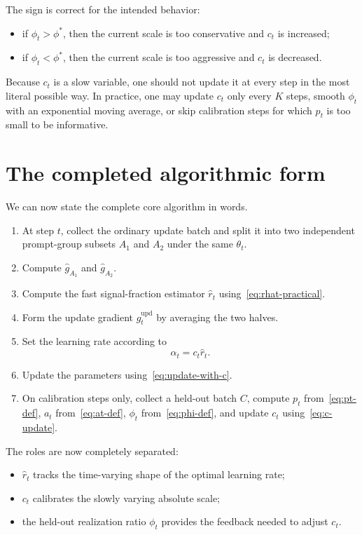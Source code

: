 \documentclass[11pt]{article}
\begin{document}
The sign is correct for the intended behavior:
\begin{itemize}
    \item if $\phi_t > \phi^*$, then the current scale is too conservative and $c_t$ is increased;
    \item if $\phi_t < \phi^*$, then the current scale is too aggressive and $c_t$ is decreased.
\end{itemize}
Because $c_t$ is a slow variable, one should not update it at every step in the most literal possible way. In practice, one may update $c_t$ only every $K$ steps, smooth $\phi_t$ with an exponential moving average, or skip calibration steps for which $p_t$ is too small to be informative.

\section{The completed algorithmic form}

We can now state the complete core algorithm in words.
\begin{enumerate}
    \item At step $t$, collect the ordinary update batch and split it into two independent prompt-group subsets $A_1$ and $A_2$ under the same $\theta_t$.
    \item Compute $\hat g_{A_1}$ and $\hat g_{A_2}$.
    \item Compute the fast signal-fraction estimator $\hat r_t$ using~\eqref{eq:rhat-practical}.
    \item Form the update gradient $\hat g_t^{\mathrm{upd}}$ by averaging the two halves.
    \item Set the learning rate according to
    \[
    \alpha_t = c_t\hat r_t.
    \]
    \item Update the parameters using~\eqref{eq:update-with-c}.
    \item On calibration steps only, collect a held-out batch $C$, compute $p_t$ from~\eqref{eq:pt-def}, $a_t$ from~\eqref{eq:at-def}, $\phi_t$ from~\eqref{eq:phi-def}, and update $c_t$ using~\eqref{eq:c-update}.
\end{enumerate}

The roles are now completely separated:
\begin{itemize}
    \item $\hat r_t$ tracks the time-varying shape of the optimal learning rate;
    \item $c_t$ calibrates the slowly varying absolute scale;
    \item the held-out realization ratio $\phi_t$ provides the feedback needed to adjust $c_t$.
\end{itemize}
\end{document}
